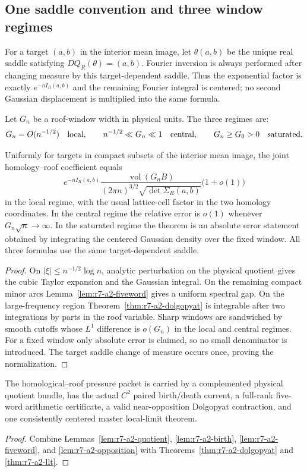 \subsection{One saddle convention and three window regimes}

For a target $(a,b)$ in the interior mean image, let $\theta(a,b)$ be the
unique real saddle satisfying
$DQ_R(\theta)=(a,b)$.  Fourier inversion is always performed after changing
measure by this target-dependent saddle.  Thus the exponential factor is
exactly $e^{-nI_R(a,b)}$ and the remaining Fourier integral is centered; no
second Gaussian displacement is multiplied into the same formula.

Let $G_n$ be a roof-window width in physical units.  The three regimes are:
\[
 G_n=O(n^{-1/2})\quad\hbox{local},
 \qquad n^{-1/2}\ll G_n\ll1\quad\hbox{central},
 \qquad G_n\ge G_0>0\quad\hbox{saturated}.
\]

\begin{theorem}
\label{thm:r7-a2-llt}
Uniformly for targets in compact subsets of the interior mean image, the joint
homology--roof coefficient equals
\[
 e^{-nI_R(a,b)}
 \frac{\operatorname{vol}(G_nB)}{(2\pi n)^{3/2}
       \sqrt{\det\Sigma_R(a,b)}}
 \bigl(1+o(1)\bigr)
\]
in the local regime, with the usual lattice-cell factor in the two homology
coordinates.  In the central regime the relative error is $o(1)$ whenever
$G_n\sqrt n\to\infty$.  In the saturated regime the theorem is an absolute
error statement obtained by integrating the centered Gaussian density over
the fixed window.  All three formulas use the same target-dependent saddle.
\end{theorem}

\begin{proof}
On $|\xi|\le n^{-1/2}\log n$, analytic perturbation on the physical quotient
gives the cubic Taylor expansion and the Gaussian integral.  On the remaining
compact minor arcs Lemma~\ref{lem:r7-a2-fiveword} gives a uniform spectral gap.
On the large-frequency region Theorem~\ref{thm:r7-a2-dolgopyat} is integrable
after two integrations by parts in the roof variable.  Sharp windows are
sandwiched by smooth cutoffs whose $L^1$ difference is $o(G_n)$ in the local
and central regimes.  For a fixed window only absolute error is claimed, so no
small denominator is introduced.  The target saddle change of measure occurs
once, proving the normalization.
\end{proof}

\begin{theorem}
\label{thm:r7-a2-main}
The homological--roof pressure packet is carried by a complemented physical
quotient bundle, has the actual $C^2$ paired birth/death current, a full-rank
five-word arithmetic certificate, a valid near-opposition Dolgopyat
contraction, and one consistently centered master local-limit theorem.
\end{theorem}

\begin{proof}
Combine Lemmas~\ref{lem:r7-a2-quotient},
\ref{lem:r7-a2-birth},
\ref{lem:r7-a2-fiveword}, and
\ref{lem:r7-a2-opposition} with
Theorems~\ref{thm:r7-a2-dolgopyat} and
\ref{thm:r7-a2-llt}.
\end{proof}
